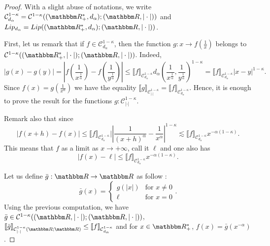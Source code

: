 \documentclass[a4paper,11pt, reqno]{amsart}
\newcommand{\cC}{\mathcal{C}}	\newcommand{\CC}{\mathbbm{C}}
\newcommand{\1}{\mathbbm{1}}
\theoremstyle{plain}
\theoremstyle{definition}
\begin{document}
\begin{proof}
    With a slight abuse of notations, we write $\cC^{1-\kappa}_{d_\alpha}=\cC^{1-\kappa}((\RR_+^*,d_\alpha);(\RR,|\cdot|))$ and $Lip_{d_\alpha}=Lip((\RR_+^*,d_\alpha);(\RR,|\cdot|))$.
    
    First, let us remark that if $f\in \cC^{1-\kappa}_{d_\alpha}$, then the function $g : x \to f\left(\frac{1}{x}\right)$ belongs to $\cC^{1-\kappa}((\RR_+^*,|\cdot|);(\RR,|\cdot|))$. Indeed, 
    \[
    |g(x)-g(y)| = \left|f\left(\frac{1}{x^{\frac{1}{\alpha}}}\right) - f\left(\frac{1}{y^{\frac1\alpha}}\right) \right| \le \llbracket f \rrbracket_{\cC^{1-\kappa}_{d_\alpha}} d_\alpha\left( \frac{1}{x^{\frac{1}{\alpha}}},\frac{1}{y^{\frac1\alpha}} \right)^{1-\kappa} = \llbracket f \rrbracket_{\cC^{1-\kappa}_{d_\alpha}} |x-y|^{1-\kappa}.
    \] 
    Since $f(x) =  g\left(\frac{1}{x^\alpha}\right)$
    we have the equality $\llbracket g \rrbracket_{\cC^{1-\kappa}_{|\cdot|}} = \llbracket f \rrbracket_{\cC^{1-\kappa}_{d_\alpha}}$. Hence, it is enough to prove the result for the functions $g : \cC^{1-\kappa}_{|\cdot|}$.

    Remark also that since 
    \[|f(x+h)-f(x)| \le \llbracket f \rrbracket_{\cC^{1-\kappa}_{d_\alpha}} |\left| \frac{1}{(x+h)^\alpha} - \frac{1}{x^\alpha} \right|^{1-\kappa} \lesssim \llbracket f \rrbracket_{\cC^{1-\kappa}_{d_\alpha}} x^{-\alpha(1-\kappa)}.\]
    This means that $f$ as a limit as $x\to +\infty$, call it $\ell$ and one also has
    \[ |f(x) - \ell| \le \llbracket f \rrbracket_{\cC^{1-\kappa}_{d_\alpha}} x^{-\alpha(1-\kappa)}.\]

    Let us define $\bar{g} : \RR \to \RR$ as follow :
    \[\bar g(x) = 
        \begin{cases}
            g(|x|) & \text{for } x\neq 0 \\
            \ell & \text{for } x=0
        \end{cases}.
    \] 
    Using the previous computation, we have $\bar{g} \in \cC^{1-\kappa}((\RR,|\cdot|);(\RR,|\cdot|))$, $\llbracket \bar{g} \rrbracket_{\cC^{1-\kappa}_{|\cdot|}(\RR;\RR)} \le \llbracket f \rrbracket_{\cC^{1-\kappa}_{d_\alpha}}$ and for $x\in \RR_+^*$, $f(x) = \bar{g}(x^{-\alpha})$.


\end{proof}
\end{document}
